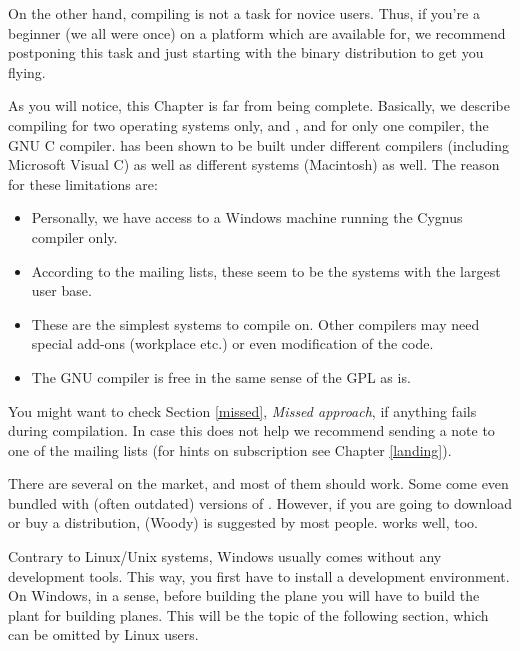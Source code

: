 On the other hand, compiling \FlightGear{} is not a task for novice users. Thus, if
you're a beginner (we all were once) on a platform which  are available
for, we recommend postponing this task and just starting with the binary
distribution to get you flying.

As you will notice, this Chapter is far from being complete. Basically, we describe
compiling for two operating systems only,  and , and for only
one compiler, the GNU C compiler. \FlightGear{} has been shown to be built under
different compilers (including Microsoft Visual C) as well as different systems
(Macintosh) as well. The reason for these limitations are:

\begin{itemize}
\item Personally, we have access to a Windows machine running the Cygnus compiler only.
\item According to the mailing lists, these seem to be the systems with the largest user base.
\item These are the simplest systems to compile \FlightGear{} on. Other compilers may need special
add-ons (workplace etc.) or even modification of the code.
\item The GNU compiler is free in the same sense of the GPL as \FlightGear{} is.
\end{itemize}

You might want to check Section \ref{missed}, \textit{Missed approach}, if
anything fails during compilation. In case this does not help we recommend sending a note to one of the mailing lists (for hints on subscription see Chapter \ref{landing}).

There are several  on the market, and most of them should work. Some come even bundled with (often outdated) versions of \FlightGear{}$\!$.
However, if you are going to download or buy a distribution,  (Woody) is
suggested by most people.  works well, too.

Contrary to Linux/Unix systems, Windows usually comes without any development tools. This
way, you first have to install a development environment. On Windows, in a sense, before
building the plane you will have to build the plant for building planes. This will be the
topic of the following section, which can be omitted by Linux users.

